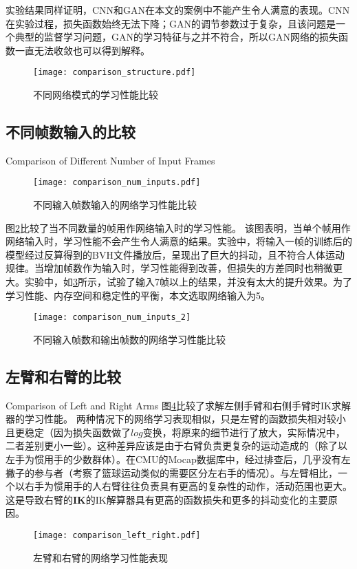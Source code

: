 实验结果同样证明，CNN和GAN在本文的案例中不能产生令人满意的表现。CNN在实验过程，损失函数始终无法下降；GAN的调节参数过于复杂，且该问题是一个典型的监督学习问题，GAN的学习特征与之并不符合，所以GAN网络的损失函数一直无法收敛也可以得到解释。
\begin{figure}[!htbp]
	\centering
	\texttt{[image: comparison\_structure.pdf]}
	\caption[]{\label{fig:comparison_structure}
		不同网络模式的学习性能比较
	}
\end{figure}
\subsection{不同帧数输入的比较}{Comparison of Different Number of Input Frames}
\label{sec:different_nums}
\begin{figure}[!htbp]
	\centering
	\texttt{[image: comparison\_num\_inputs.pdf]}
	\caption[]{\label{fig:comparison_num_inputs}
		不同输入帧数输入的网络学习性能比较
	}
\end{figure}
图\ref{fig:comparison_num_inputs}比较了当不同数量的帧用作网络输入时的学习性能。 该图表明，当单个帧用作网络输入时，学习性能不会产生令人满意的结果。实验中，将输入一帧的训练后的模型经过反算得到的BVH文件播放后，呈现出了巨大的抖动，且不符合人体运动规律。当增加帧数作为输入时，学习性能得到改善，但损失的方差同时也稍微更大。实验中，如\cref{fig:comparison_num_inputs2}所示，试验了输入7帧以上的结果，并没有太大的提升效果。为了学习性能、内存空间和稳定性的平衡，本文选取网络输入为5。
\begin{figure}[!htbp]
	\centering
	\texttt{[image: comparison\_num\_inputs\_2]}
	\caption[]{\label{fig:comparison_num_inputs2}
		不同输入帧数和输出帧数的网络学习性能比较
	}
\end{figure}
\subsection{左臂和右臂的比较}{Comparison of Left and Right Arms}
图\ref{fig:comparison_left_right}比较了求解左侧手臂和右侧手臂时IK求解器的学习性能。
两种情况下的网络学习表现相似，只是左臂的函数损失相对较小且更稳定（因为损失函数做了$log$变换，将原来的细节进行了放大，实际情况中，二者差别更小一些）。这种差异应该是由于右臂负责更复杂的运动造成的（除了以左手为惯用手的少数群体）。在CMU的Mocap数据库中，经过排查后，几乎没有左撇子的参与者（考察了篮球运动类似的需要区分左右手的情况）。与左臂相比，一个以右手为惯用手的人右臂往往负责具有更高的复杂性的动作，活动范围也更大。这是导致右臂的$\mathbf{IK}$的IK解算器具有更高的函数损失和更多的抖动变化的主要原因。
\begin{figure}[!htbp]
	\centering
	\texttt{[image: comparison\_left\_right.pdf]}
	\caption[]{\label{fig:comparison_left_right}
		左臂和右臂的网络学习性能表现
	}
\end{figure}
